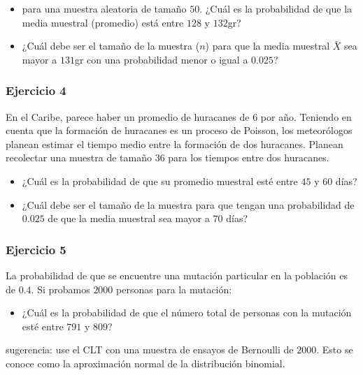 \documentclass[
]{book}
\providecommand{\tightlist}{%
  \setlength{\itemsep}{0pt}\setlength{\parskip}{0pt}}
\begin{document}
\begin{itemize}
\item
  para una muestra aleatoria de tamaño \(50\). ¿Cuál es la probabilidad de que
  la media muestral (promedio) está entre \(128\) y \(132\)gr?
\item
  ¿Cuál debe ser el tamaño de la muestra (\(n\)) para que la media muestral \(\bar{X}\) sea mayor a \(131\)gr con una probabilidad menor o igual a \(0.025\)?
\end{itemize}

\hypertarget{ejercicio-4-3}{%
\subsubsection{Ejercicio 4}\label{ejercicio-4-3}}

En el Caribe, parece haber un promedio de huracanes de \(6\) por año. Teniendo en cuenta que la formación de huracanes es un proceso de Poisson, los meteorólogos planean estimar el tiempo medio entre la formación de dos huracanes. Planean recolectar una muestra de tamaño \(36\) para los tiempos entre dos huracanes.

\begin{itemize}
\item
  ¿Cuál es la probabilidad de que su promedio muestral esté entre \(45\) y \(60\) días?
\item
  ¿Cuál debe ser el tamaño de la muestra para que tengan una probabilidad de \(0.025\) de que la media muestral sea mayor a \(70\) días?
\end{itemize}

\hypertarget{ejercicio-5-2}{%
\subsubsection{Ejercicio 5}\label{ejercicio-5-2}}

La probabilidad de que se encuentre una mutación particular en la población es de \(0.4\). Si probamos \(2000\) personas para la mutación:

\begin{itemize}
\tightlist
\item
  ¿Cuál es la probabilidad de que el número total de personas con la mutación esté entre \(791\) y \(809\)?
\end{itemize}

sugerencia: use el CLT con una muestra de ensayos de Bernoulli de \(2000\). Esto se conoce como la aproximación normal de la distribución binomial.
\end{document}
